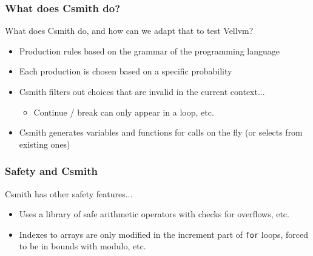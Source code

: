 \documentclass{beamer}
\begin{document}
\begin{frame}
    \frametitle{What does Csmith do?}
  What does Csmith do, and how can we adapt that to test Vellvm?

  \begin{itemize}
  \item Production rules based on the grammar of the programming
    language
  \item Each production is chosen based on a specific probability
  \item Csmith filters out choices that are invalid in the current
    context...
    \begin{itemize}
    \item Continue / break can only appear in a loop, etc.
    \end{itemize}
  \item Csmith generates variables and functions for calls on the fly
    (or selects from existing ones)
  \end{itemize}
\end{frame}

\begin{frame}
  \frametitle{Safety and Csmith}
  \item Csmith has other safety features...
    \begin{itemize}
    \item Uses a library of safe arithmetic operators with checks for
      overflows, etc.
    \item Indexes to arrays are only modified in the increment part of
      {\tt for} loops, forced to be in bounds with modulo, etc.
    \end{itemize}

\end{frame}



\end{document}
